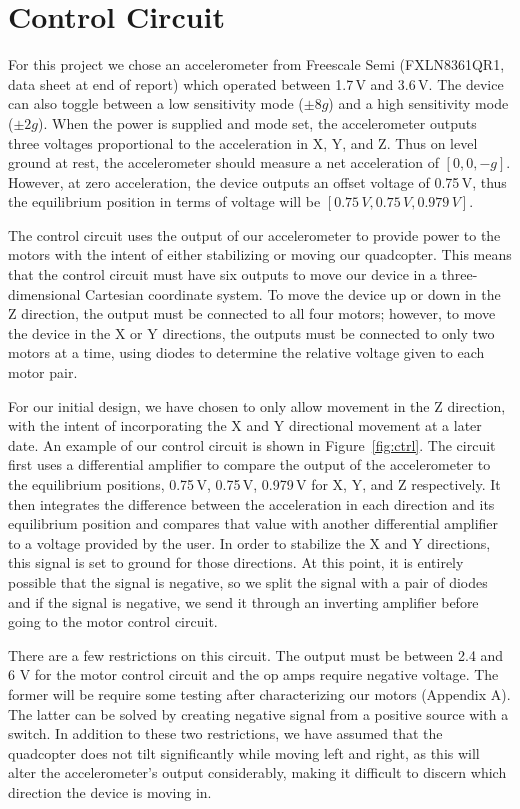 \section{Control Circuit}

For this project we chose an accelerometer from Freescale Semi (FXLN8361QR1, data sheet at end of report) which operated between 1.7\,V and 3.6\,V. The device can also toggle between a low sensitivity mode ($\pm8g$) and a high sensitivity mode ($\pm2g$). When the power is supplied and mode set, the accelerometer outputs three voltages proportional to the acceleration in X, Y, and Z. Thus on level ground at rest, the accelerometer should measure a net acceleration of $[0,0,-g]$. However, at zero acceleration, the device outputs an offset voltage of 0.75\,V, thus the equilibrium position in terms of voltage will be $[0.75\,V,0.75\,V,0.979\,V]$.

The control circuit uses the output of our accelerometer to provide power to the motors with the intent of either stabilizing or moving our quadcopter. This means that the control circuit must have six outputs to move our device in a three-dimensional Cartesian coordinate system. To move the device up or down in the Z direction, the output must be connected to all four motors; however, to move the device in the X or Y directions, the outputs must be connected to only two motors at a time, using diodes to determine the relative voltage given to each motor pair. 

For our initial design, we have chosen to only allow movement in the Z direction, with the intent of incorporating the X and Y directional movement at a later date. An example of our control circuit is shown in Figure~\ref{fig:ctrl}. The circuit first uses a differential amplifier to compare the output of the accelerometer to the equilibrium positions, 0.75\,V, 0.75\,V, 0.979\,V for X, Y, and Z respectively. It then integrates the difference between the acceleration in each direction and its equilibrium position and compares that value with another differential amplifier to a voltage provided by the user. In order to stabilize the X and Y directions, this signal is set to ground for those directions. At this point, it is entirely possible that the signal is negative, so we split the signal with a pair of diodes and if the signal is negative, we send it through an inverting amplifier before going to the motor control circuit.

There are a few restrictions on this circuit. The output must be between 2.4 and 6 V for the motor control circuit and the op amps require negative voltage. The former will be require some testing after characterizing our motors (Appendix A). The latter can be solved by creating negative signal from a positive source with a switch. In addition to these two restrictions, we have assumed that the quadcopter does not tilt significantly while moving left and right, as this will alter the accelerometer's output considerably, making it difficult to discern which direction the device is moving in.

